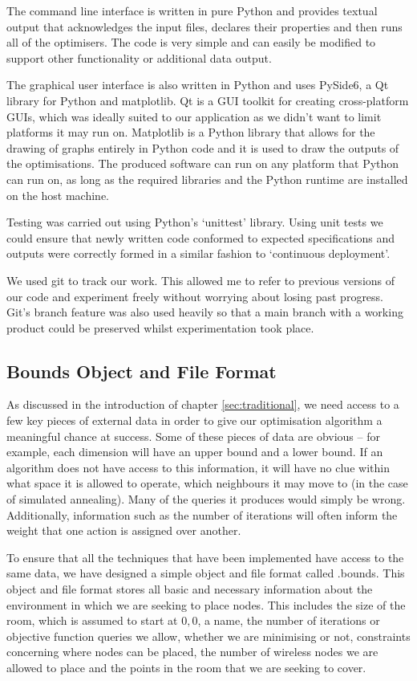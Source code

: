 		The command line interface is written in pure Python and provides textual output that acknowledges the input files, declares their properties and then runs all of the optimisers. The code is very simple and can easily be modified to support other functionality or additional data output.

		The graphical user interface is also written in Python and uses PySide6, a Qt library for Python and matplotlib. Qt is a GUI toolkit for creating cross-platform GUIs, which was ideally suited to our application as we didn't want to limit platforms it may run on. Matplotlib is a Python library that allows for the drawing of graphs entirely in Python code and it is used to draw the outputs of the optimisations. The produced software can run on any platform that Python can run on, as long as the required libraries and the Python runtime are installed on the host machine.

		Testing was carried out using Python's `unittest' library. Using unit tests we could ensure that newly written code conformed to expected specifications and outputs were correctly formed in a similar fashion to `continuous deployment'\cite{shahin2017deployment}.

		We used git\cite{gitscm} to track our work. This allowed me to refer to previous versions of our code and experiment freely without worrying about losing past progress. Git's branch feature was also used heavily so that a main branch with a working product could be preserved whilst experimentation took place.

	\subsection{Bounds Object and File Format}
		\label{sec:software_bounds}
		As discussed in the introduction of chapter \ref{sec:traditional}, we need access to a few key pieces of external data in order to give our optimisation algorithm a meaningful chance at success. Some of these pieces of data are obvious -- for example, each dimension will have an upper bound and a lower bound. If an algorithm does not have access to this information, it will have no clue within what space it is allowed to operate, which neighbours it may move to (in the case of simulated annealing). Many of the queries it produces would simply be wrong. Additionally, information such as the number of iterations will often inform the weight that one action is assigned over another.
		
		To ensure that all the techniques that have been implemented have access to the same data, we have designed a simple object and file format called .bounds. This object and file format stores all basic and necessary information about the environment in which we are seeking to place nodes. This includes the size of the room, which is assumed to start at $0, 0$, a name, the number of iterations or objective function queries we allow, whether we are minimising or not, constraints concerning where nodes can be placed, the number of wireless nodes we are allowed to place and the points in the room that we are seeking to cover.

